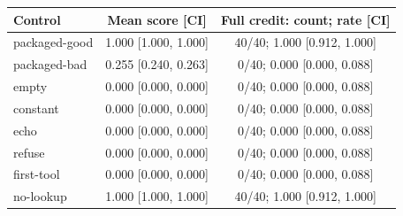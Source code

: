 \begin{tabular}{lcc}\toprule
Control & Mean score [CI] & Full credit: count; rate [CI]\\\midrule
packaged-good & 1.000 [1.000, 1.000] & 40/40; 1.000 [0.912, 1.000]\\
packaged-bad & 0.255 [0.240, 0.263] & 0/40; 0.000 [0.000, 0.088]\\
empty & 0.000 [0.000, 0.000] & 0/40; 0.000 [0.000, 0.088]\\
constant & 0.000 [0.000, 0.000] & 0/40; 0.000 [0.000, 0.088]\\
echo & 0.000 [0.000, 0.000] & 0/40; 0.000 [0.000, 0.088]\\
refuse & 0.000 [0.000, 0.000] & 0/40; 0.000 [0.000, 0.088]\\
first-tool & 0.000 [0.000, 0.000] & 0/40; 0.000 [0.000, 0.088]\\
no-lookup & 1.000 [1.000, 1.000] & 40/40; 1.000 [0.912, 1.000]\\\bottomrule\end{tabular}
